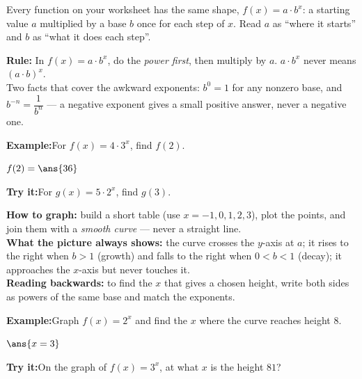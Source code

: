 \documentclass[12pt]{article}
\begin{document}

\noindent\small Every function on your worksheet has the same shape,
$f(x) = a \cdot b^{x}$: a starting value $a$ multiplied by a base $b$ once for
each step of $x$. Read $a$ as ``where it starts'' and $b$ as ``what it does
each step''.\normalsize

\begin{formulabox}
\textbf{Rule:} In $f(x) = a \cdot b^{x}$, do the \emph{power first}, then
multiply by $a$. \quad $a \cdot b^{x}$ never means $(a \cdot b)^{x}$.\\[3pt]
Two facts that cover the awkward exponents: $b^{0} = 1$ for any nonzero base,
and $b^{-n} = \dfrac{1}{b^{n}}$ --- a negative exponent gives a small positive
answer, never a negative one.
\end{formulabox}
\begin{examplebox}
\textbf{Example:}\quad For $f(x) = 4 \cdot 3^{x}$, find $f(2)$.

$f(2) = \ans{36}$
\end{examplebox}
\begin{tryitbox}
\textbf{Try it:}\quad For $g(x) = 5 \cdot 2^{x}$, find $g(3)$.\\[2pt]
\end{tryitbox}

\begin{formulabox}
\textbf{How to graph:} build a short table (use $x = -1, 0, 1, 2, 3$), plot the
points, and join them with a \emph{smooth curve} --- never a straight line.\\[3pt]
\textbf{What the picture always shows:} the curve crosses the $y$-axis at $a$;
it rises to the right when $b > 1$ (growth) and falls to the right when
$0 < b < 1$ (decay); it approaches the $x$-axis but never touches it.\\[3pt]
\textbf{Reading backwards:} to find the $x$ that gives a chosen height, write
both sides as powers of the same base and match the exponents.
\end{formulabox}
\begin{examplebox}
\textbf{Example:}\quad Graph $f(x) = 2^{x}$ and find the $x$ where the curve
reaches height $8$.

$\ans{x = 3}$
\end{examplebox}
\begin{tryitbox}
\textbf{Try it:}\quad On the graph of $f(x) = 3^{x}$, at what $x$ is the height
$81$?\\[2pt]
\end{tryitbox}
\end{document}
